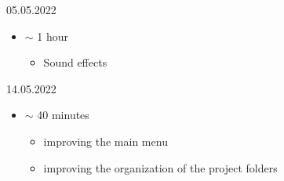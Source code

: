 \documentclass{article}
\begin{document}
05.05.2022
\begin{itemize}
	\item $\sim$ 1 hour
	\begin{itemize}
		\item Sound effects
	\end{itemize}
\end{itemize}

14.05.2022
\begin{itemize}
	\item $\sim$ 40 minutes
	\begin{itemize}
		\item improving the main menu
		\item improving the organization of the project folders
	\end{itemize}
\end{itemize}
\end{document}
